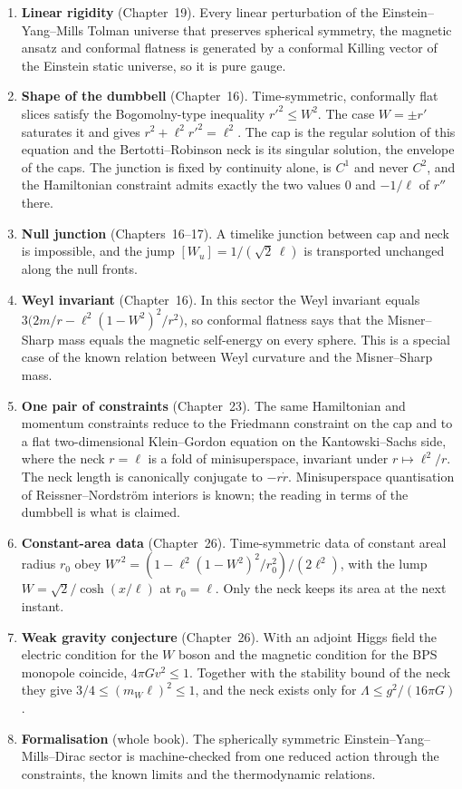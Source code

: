 \begin{enumerate}[leftmargin=*,label=(\arabic*)]
\item \textbf{Linear rigidity} (Chapter~19). Every linear perturbation of the Einstein--Yang--Mills Tolman universe that preserves spherical symmetry, the magnetic ansatz and conformal flatness is generated by a conformal Killing vector of the Einstein static universe, so it is pure gauge.
\item \textbf{Shape of the dumbbell} (Chapter~16). Time-symmetric, conformally flat slices satisfy the Bogomolny-type inequality $r'^2\le W^2$. The case $W=\pm r'$ saturates it and gives $r^2+\ell^2r'^2=\ell^2$. The cap is the regular solution of this equation and the Bertotti--Robinson neck is its singular solution, the envelope of the caps. The junction is fixed by continuity alone, is $C^1$ and never $C^2$, and the Hamiltonian constraint admits exactly the two values $0$ and $-1/\ell$ of $r''$ there.
\item \textbf{Null junction} (Chapters~16--17). A timelike junction between cap and neck is impossible, and the jump $[W_u]=1/(\sqrt2\,\ell)$ is transported unchanged along the null fronts.
\item \textbf{Weyl invariant} (Chapter~16). In this sector the Weyl invariant equals $3\bigl(2m/r-\ell^2(1-W^2)^2/r^2\bigr)$, so conformal flatness says that the Misner--Sharp mass equals the magnetic self-energy on every sphere. This is a special case of the known relation between Weyl curvature and the Misner--Sharp mass.
\item \textbf{One pair of constraints} (Chapter~23). The same Hamiltonian and momentum constraints reduce to the Friedmann constraint on the cap and to a flat two-dimensional Klein--Gordon equation on the Kantowski--Sachs side, where the neck $r=\ell$ is a fold of minisuperspace, invariant under $r\mapsto\ell^2/r$. The neck length is canonically conjugate to $-r\dot r$. Minisuperspace quantisation of Reissner--Nordstr\"om interiors is known; the reading in terms of the dumbbell is what is claimed.
\item \textbf{Constant-area data} (Chapter~26). Time-symmetric data of constant areal radius $r_0$ obey $W'^2=(1-\ell^2(1-W^2)^2/r_0^2)/(2\ell^2)$, with the lump $W=\sqrt2/\cosh(x/\ell)$ at $r_0=\ell$. Only the neck keeps its area at the next instant.
\item \textbf{Weak gravity conjecture} (Chapter~26). With an adjoint Higgs field the electric condition for the $W$ boson and the magnetic condition for the BPS monopole coincide, $4\pi Gv^2\le1$. Together with the stability bound of the neck they give $3/4\le(m_W\ell)^2\le1$, and the neck exists only for $\Lambda\le g^2/(16\pi G)$.
\item \textbf{Formalisation} (whole book). The spherically symmetric Einstein--Yang--Mills--Dirac sector is machine-checked from one reduced action through the constraints, the known limits and the thermodynamic relations.
\end{enumerate}

